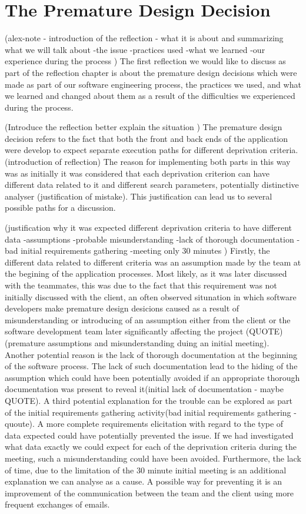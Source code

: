 \documentclass{l3proj}
\begin{document}
\section{The Premature Design Decision}
\label{design}

(alex-note - introduction of the reflection - what it is about and summarizing what we will talk about
-the issue
-practices used
-what we learned
-our experience during the process
)
The first reflection we would like to discuss as part of the reflection chapter is about the premature design decisions which were made as part of our software engineering process, the practices we used, and what we learned and changed about them as a result of the difficulties we experienced during the process.

(Introduce the reflection better explain the situation )
The premature design decision refers to the fact that both the front and back ends of the application were develop to expect separate execution paths for different deprivation criteria.(introduction of reflection) The reason for implementing both parts in this way was as initially it was considered that each deprivation criterion can have different data related to it and different search parameters, potentially distinctive analyser (justification of mistake). This justification can lead us to several possible paths for a  discussion.

(justification why  it was expected different deprivation criteria to have different data
-assumptions
-probable misunderstanding
-lack of thorough documentation
-bad initial requirements gathering
-meeting only 30 minutes
)
Firstly, the different data related to different criteria was an assumption made by the team at the begining of the application processes. Most likely, as it was later discussed with the teammates, this was due to the fact that this requirement was not initially discussed with the client, an often observed situnation in which software developers make premature design desicions caused as a result of misunderstanding or introducing of an assumption either from the client or the software development team later significantly affecting the project (QUOTE)(premature assumptions and misunderstanding duing an initial meeting). Another potential reason is the lack of thorough documentation at the beginning of the software process. The lack of such documentation lead to the hiding of the assumption which could have been potentially avoided if an appropriate thorough documentation was present to reveal it(initial lack of documentation - maybe QUOTE). A third potential explanation for the trouble can be explored as part of the initial requirements gathering activity(bad initial requirements gathering - quoute). A more complete requirements elicitation with regard to the type of data expected could have potentially prevented the issue. If we had investigated what data exactly we could expect for each of the deprivation criteria during the meeting, such a misunderstanding could have been avoided. Furthermore, the lack of time, due to the limitation of the 30 minute initial meeting is an additional explanation we can analyse as a cause. A possible way for preventing it is an improvement of the communication between the team and the client using more frequent exchanges of emails.
\end{document}
